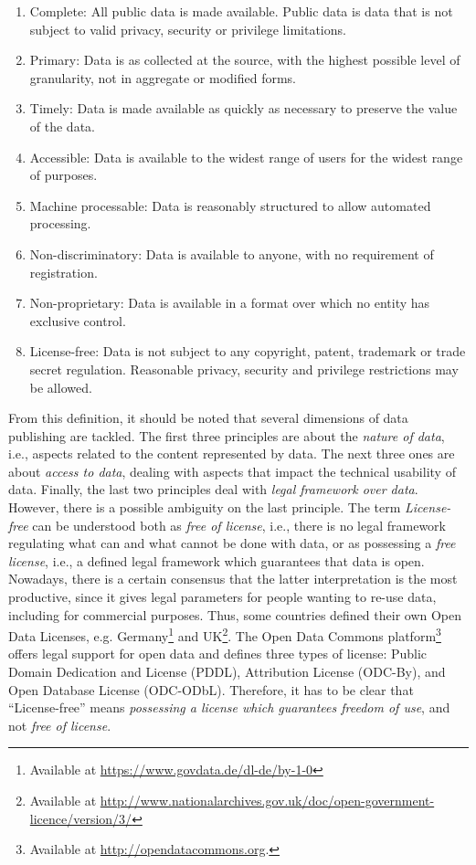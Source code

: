 \begin{enumerate}
	\item Complete: All public data is made available. Public data is data that is not subject to valid privacy, security or privilege limitations. 
	\item Primary: Data is as collected at the source, with the highest possible level of granularity, not in aggregate or modified forms. 
	\item Timely: Data is made available as quickly as necessary to preserve the value of the data. 
	\item Accessible: Data is available to the widest range of users for the widest range of purposes. 
	\item Machine processable: Data is reasonably structured to allow automated processing. 
	\item Non-discriminatory: Data is available to anyone, with no requirement of registration. 
	\item Non-proprietary: Data is available in a format over which no entity has exclusive control. 
	\item License-free: Data is not subject to any copyright, patent, trademark or trade secret regulation. Reasonable privacy, security and privilege restrictions may be allowed. 
\end{enumerate}

From this definition, it should be noted that several dimensions of data publishing are tackled.
The first three principles are about the \emph{nature of data}, i.e., aspects related to the content represented by data.
The next three ones are about \emph{access to data}, dealing with aspects that impact the technical usability of data.
Finally, the last two principles deal with \emph{legal framework over data}.
However, there is a possible ambiguity on the last principle.
The term \emph{License-free} can be understood both as \emph{free of license}, i.e., there is no legal framework regulating what can and what cannot be done with data, or as possessing a \emph{free license}, i.e., a defined legal framework which guarantees that data is open. 
Nowadays, there is a certain consensus that the latter interpretation is the most productive, since it gives legal parameters for people wanting to re-use data, including for commercial purposes.
Thus, some countries defined their own Open Data Licenses, e.g. Germany\footnote{Available at \url{https://www.govdata.de/dl-de/by-1-0}} and UK\footnote{Available at \url{http://www.nationalarchives.gov.uk/doc/open-government-licence/version/3/}}.
The Open Data Commons platform\footnote{Available at \url{http://opendatacommons.org}.} offers legal support for open data and defines three types of license: Public Domain Dedication and License (PDDL), Attribution License (ODC-By), and Open Database License (ODC-ODbL).
Therefore, it has to be clear that ``License-free'' means \emph{possessing a license which guarantees freedom of use}, and not \emph{free of license}.

